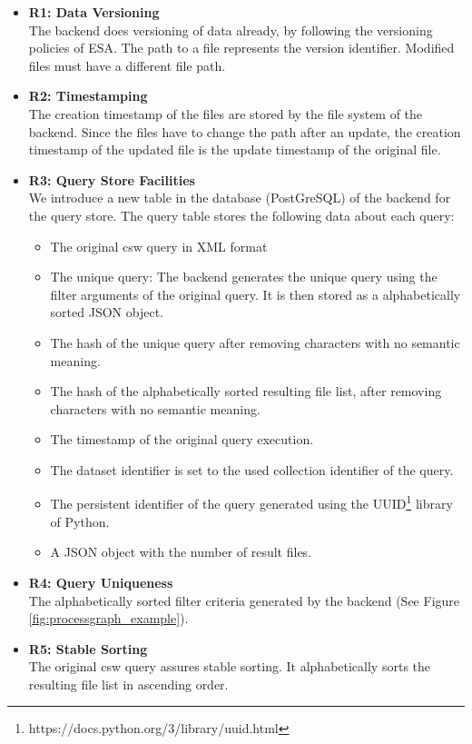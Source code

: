 \documentclass[draft,final]{vutinfth} %
\newcommand{\bgoesswein}[1]{{\color{blue}#1}}
\begin{document}
\begin{itemize}
	\item \textbf{R1: Data Versioning} \\
	The backend does versioning of data already, by following the versioning policies of ESA. The path to a file represents the version identifier. Modified files must have a different file path.
	\item \textbf{R2: Timestamping} \\
	The creation timestamp of the files are stored by the file system of the backend. Since the files have to change the path after an update, the creation timestamp of the updated file is the update timestamp of the original file. 
	\item \textbf{R3: Query Store Facilities} \\
	We introduce a new table in the database (PostGreSQL) of the backend for the query store. The query table stores the following data about each query:
	\begin{itemize}
		\item The original \acrshort{csw} query in XML format
		\item The unique query: The backend generates the unique query using the filter arguments of the original query. It is then stored as a alphabetically sorted JSON object. 
		\item The hash of the unique query after removing characters with no semantic meaning.
		\item The hash of the alphabetically sorted resulting file list, after removing characters with no semantic meaning. 
		\item The timestamp of the original query execution.
		\item The dataset identifier is set to the used collection identifier of the query.
		\item The persistent identifier of the query generated using the UUID\footnote{https://docs.python.org/3/library/uuid.html} library of Python.
		\item A JSON object with the number of result files.
	\end{itemize}
	\item \textbf{R4: Query Uniqueness} \\
	The alphabetically sorted \bgoesswein{filter criteria} generated by the backend (See Figure \ref{fig:processgraph_example}).
	\item \textbf{R5: Stable Sorting} \\
	The original \acrshort{csw} query assures stable sorting. It alphabetically sorts the resulting file list in ascending order.

\end{itemize}
\end{document}
